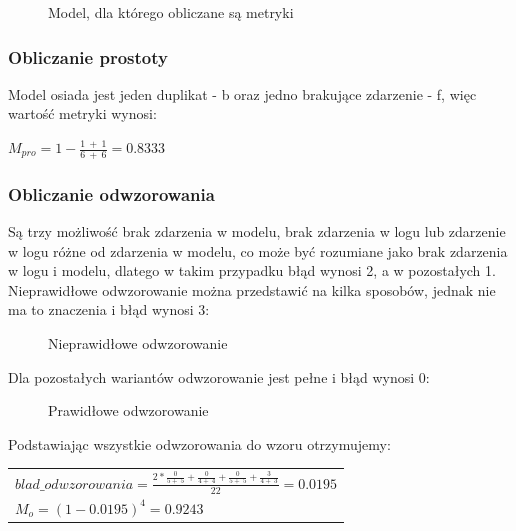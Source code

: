 \begin{figure}[h]
	\caption{\label{fig:metrics_business_process}Model, dla którego obliczane są metryki}
\end{figure}

\subsubsection{Obliczanie prostoty}
Model osiada jest jeden duplikat - b oraz jedno brakujące zdarzenie - f, więc wartość metryki wynosi:
\begin{center}
$M_{pro} = 1 - \frac{1\ +\ 1}{6\ +\ 6} = 0.8333$
\end{center}

\subsubsection{Obliczanie odwzorowania}
\label{alignment-calculation}
Są trzy możliwość brak zdarzenia w modelu, brak zdarzenia w logu lub zdarzenie w logu różne od zdarzenia w modelu, co może być rozumiane jako brak zdarzenia w logu i modelu, dlatego w takim przypadku błąd wynosi 2, a w pozostałych 1. 
Nieprawidłowe odwzorowanie można przedstawić na kilka sposobów, jednak nie ma to znaczenia i błąd wynosi 3:
\begin{figure}[h]
	\caption{\label{fig:bad-alignment}Nieprawidłowe odwzorowanie}
\end{figure}
\newline Dla pozostałych wariantów odwzorowanie jest pełne i błąd wynosi 0:
\begin{figure}[h]
	\caption{\label{fig:good-alignment}Prawidłowe odwzorowanie}
\end{figure}
\newline Podstawiając wszystkie odwzorowania do wzoru otrzymujemy:
\begin{center}
\begin{tabular}{l}
$blad\_odwzorowania = \frac{2 * \frac{0}{5 +\ 5} + \frac{0}{4 +\ 4} + \frac{0}{5 +\ 5} + \frac{3}{4 +\ 3}}{22} = 0.0195$ \\

$M_o = (1 - 0.0195)^4 = 0.9243$
\end{tabular}
\end{center}

